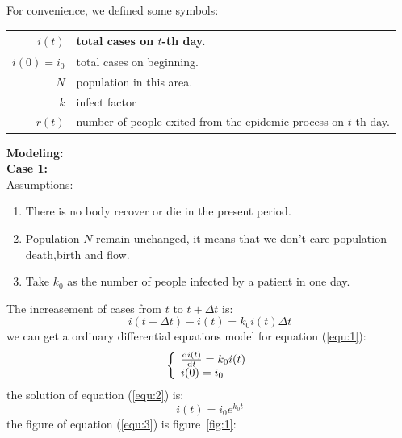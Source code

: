 For convenience, we defined some symbols:
\begin{center}
\begin{tabular}{|r|p{7cm}|}
\hline
$ i(t) $ & total cases on $t$-th day.\\
\hline
$ i(0)=i_0 $ & total cases on beginning.\\
\hline
$ N $ & population in this area.\\
\hline
$ k $ & infect factor\\
\hline
$ r(t) $ & number of people exited from the epidemic process on
$t$-th day.\\
\hline
\end{tabular}
\end{center}%
\textbf{\large Modeling:}\\
\textbf{Case 1:}\\
Assumptions:
\begin{enumerate}
  \item There is no body recover or die in the present period.
  \item Population $ N $ remain unchanged, it means
  that we don't care population death,birth and flow.
  \item Take $ k_0 $ as the number of people infected by
a patient in one day.
\end{enumerate}
The increasement of cases from $ t $ to $ t+\Delta t$ is:
\begin{equation}
i(t+\Delta{t})-i(t)=k_0i(t)\Delta{t}
\label{equ:1}
\end{equation}
we can get a ordinary differential equations model for 
equation (\ref{equ:1}):
\begin{equation}
\left\{
\begin{array}{l}
\frac{{\mathrm{d}}i(t)}{{\mathrm{d}}t}=k_0i(t)\\
i(0)=i_0
\end{array}\right.
\label{equ:2}
\end{equation}
the solution of equation (\ref{equ:2}) is:
\begin{equation}
i(t)=i_0e^{k_0t}
\label{equ:3}
\end{equation}
the figure of equation (\ref{equ:3}) is figure~\ref{fig:1}:\par
